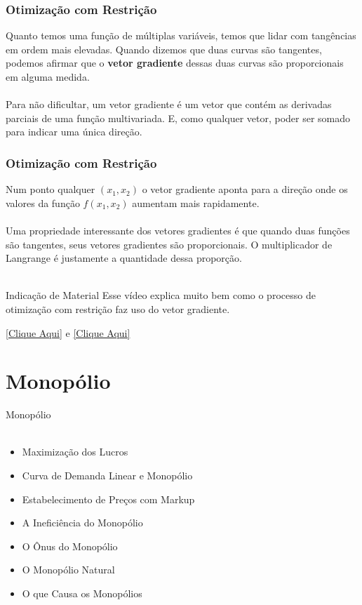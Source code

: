 \documentclass{beamer}[10]
\begin{document}
\begin{frame}
	\frametitle{Otimização com Restrição}

	Quanto temos uma função de múltiplas variáveis, temos que lidar com tangências em ordem mais elevadas. Quando dizemos que duas curvas são tangentes, podemos afirmar que o \textbf{vetor gradiente} dessas duas curvas são proporcionais em alguma medida.
	\\~\\
	Para não dificultar, um vetor gradiente é um vetor que contém as derivadas parciais de uma função multivariada. E, como qualquer vetor, poder ser somado para indicar uma única direção.
\end{frame}

\begin{frame}
	\frametitle{Otimização com Restrição}

	Num ponto qualquer $(x_1,x_2)$ o vetor gradiente aponta para a direção onde os valores da função $f(x_1,x_2)$ aumentam mais rapidamente.
	\\~\\
	Uma propriedade interessante dos vetores gradientes é que quando duas funções são tangentes, seus vetores gradientes são proporcionais. O multiplicador de Langrange é justamente a quantidade dessa proporção.
	\\~\\
	\begin{block}{Indicação de Material}
		Esse vídeo explica muito bem como o processo de otimização com restrição faz uso do vetor gradiente.
		\\
		\begin{center}
			\href{https://www.youtube.com/watch?v=yuqB-d5MjZA}{[Clique Aqui]} 
			e
			\href{https://www.youtube.com/watch?v=hQ4UNu1P2kw}{[Clique Aqui]}
		\end{center}
	\end{block}
\end{frame}

\section{Monopólio}

\begin{frame}
	\Huge Monopólio \normalsize
	\\~\\
	\begin{itemize}
		\item Maximização dos Lucros
		\item Curva de Demanda Linear e Monopólio
		\item Estabelecimento de Preços com Markup
		\item A Ineficiência do Monopólio
		\item O Ônus do Monopólio
		\item O Monopólio Natural
		\item O que Causa os Monopólios
	\end{itemize}
\end{frame}
\end{document}
